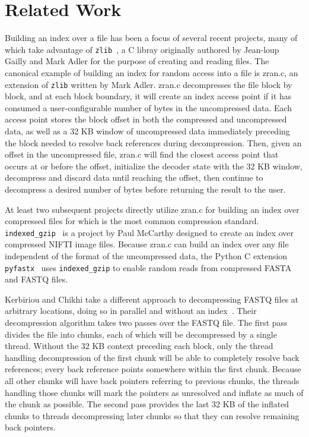 \section{Related Work}

Building an index over a \gzip file has been a focus of several recent projects,
many of which take advantage of \texttt{zlib}~\cite{zlib}, a C libray originally
authored by Jean-loup Gailly and Mark Adler for the purpose of creating and reading
\gzip files. The canonical example of building an index for random access into a \gzip 
file is zran.c, an extension of \texttt{zlib} written by Mark Adler. zran.c decompresses 
the \gzip file block by block, and at each block boundary, it will create an index access 
point if it has consumed a user-configurable number of bytes in the uncompressed data. 
Each access point stores the block offset in both the compressed and uncompressed data, 
as well as a 32 KB window of uncompressed data immediately preceding the block needed 
to resolve back references during decompression. Then, given an offset in the uncompressed 
file, zran.c will find the closest access point that occurs at or before the offset, 
initialize the decoder state with the 32 KB window, decompress and discard data until
reaching the offset, then continue to decompress a desired number of bytes before returning
the result to the user.

At least two subsequent projects directly utilize zran.c for building an index over 
compressed files for which \gzip is the most common compression standard.
\texttt{indexed\_gzip}~\cite{indexedgzip} is a project by Paul McCarthy designed
to create an index over compressed NIFTI image files. Because zran.c can build an
index over any \gzip file independent of the format of the uncompressed data, the
Python C extension \texttt{pyfastx}~\cite{pyfastx} uses \texttt{indexed\_gzip} to
enable random reads from compressed FASTA and FASTQ files.

Kerbiriou and Chikhi take a different approach to decompressing FASTQ \gzip files
at arbitrary locations, doing so in parallel and without an index~\cite{kerbiriou2019parallel}.
Their decompression algorithm takes two passes over the FASTQ \gzip file. The first
pass divides the \gzip file into chunks, each of which will be decompressed by a single
thread. Without the 32 KB context preceding each block, only the thread handling 
decompression of the first chunk will be able to completely resolve back references;
every back reference points somewhere within the first chunk. Because all other chunks
will have back pointers referring to previous chunks, the threads handling those chunks
will mark the pointers as unresolved and inflate as much of the chunk as possible. The 
second pass provides the last 32 KB of the inflated chunks to threads decompressing 
later chunks so that they can resolve remaining back pointers.


